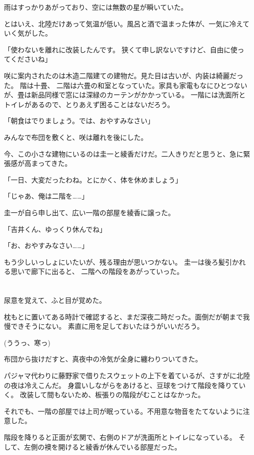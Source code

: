 ﻿\documentclass[
    book,tate,
    line_length=30zw,
    jafontsize=12pt,
    paper=b5j,
    landscape,
    ]{jlreq}
\begin{document}
雨はすっかりあがっており、空には無数の星が瞬いていた。

とはいえ、北陸だけあって気温が低い。風呂と酒で温まった体が、一気に冷えていく気がした。

「使わないを離れに改装したんです。 狭くて申し訳ないですけど、自由に使ってくださいね」

咲に案内されたのは木造二階建ての建物だ。見た目は古いが、内装は綺麗だった。 階は十畳、
二階は六畳の和室となっていた。家具も家電もなにひとつないが、畳は新品同様で窓には深緑のカーテンがかかっている。
一階には洗面所とトイレがあるので、とりあえず困ることはないだろう。

「朝食はでりましょう。では、おやすみなさい」

みんなで布団を敷くと、咲は離れを後にした。

今、この小さな建物にいるのは圭一と綾香だけだ。二人きりだと思うと、急に緊張感が高まってきた。

「一日、大変だったわね。とにかく、体を休めましょう」

「じゃあ、俺は二階を……」

圭一が自ら申し出て、広い一階の部屋を綾香に譲った。

「吉井くん、ゆっくり休んでね」

「お、おやすみなさい……」

もう少しいっしょにいたいが、残る理由が思いつかない。 圭一は後ろ髪引かれる思いで廊下に出ると、
二階への階段をあがっていった。

\section*{}

尿意を覚えて、ふと目が覚めた。

枕もとに置いてある時計で確認すると、まだ深夜二時だった。面倒だが朝まで我慢できそうにない。
素直に用を足しておいたほうがいいだろう。

(ううっ、寒っ)

布団から抜けだすと、真夜中の冷気が全身に纏わりついてきた。

パジャマ代わりに藤野家で借りたスウェットの上下を着ているが、さすがに北陸の夜は冷えこんだ。
身震いしながらをあけると、豆球をつけて階段を降りていく。 
改装して間もないため、板張りの階段がむことはなかった。

それでも、一階の部屋では上司が眠っている。不用意な物音をたてないように注意した。

階段を降りると正面が玄関で、右側のドアが洗面所とトイレになっている。
そして、左側の襖を開けると綾香が休んでいる部屋だった。
\end{document}
